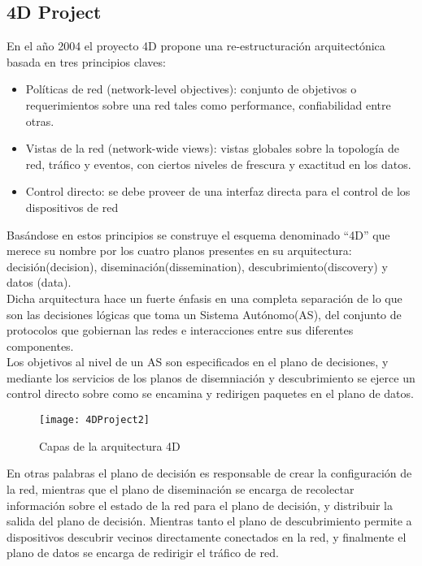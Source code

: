 \subsection{4D Project}
En el año 2004 el proyecto 4D \citep{rexford2004network}\citep{greenberg2005clean} propone una re-estructuración arquitectónica basada en tres principios claves: 

\begin{itemize}
\item Políticas de red (network-level objectives): conjunto de objetivos o requerimientos sobre una red tales como performance, confiabilidad entre otras.

\item Vistas de la red (network-wide views): vistas globales sobre la topolog\'ia de red, tr\'afico y eventos, con ciertos niveles de frescura y exactitud en los datos.

\item Control directo: se debe proveer de una interfaz directa para el control de los dispositivos de red
\end{itemize}

Basándose en estos principios se construye el esquema denominado ``4D'' que merece su nombre por los cuatro planos presentes en su arquitectura: decisión(decision), diseminación(dissemination), descubrimiento(discovery) y datos (data).\\

Dicha arquitectura hace un fuerte énfasis en una completa separación de lo que son las decisiones lógicas que toma un Sistema Autónomo(AS), del conjunto de protocolos que gobiernan las redes e interacciones entre sus diferentes componentes.\\

Los objetivos al nivel de un AS son especificados en el plano de decisiones, y mediante los servicios de los planos de disemniación y descubrimiento se ejerce un control directo sobre como se encamina y redirigen paquetes en el plano de datos.\\

\begin{figure}[htbp!] 
\centering    
\texttt{[image: 4DProject2]}
\caption[Capas de la arquitectura 4D]{Capas de la arquitectura 4D}
\label{fig:4DProject}
\end{figure}

En otras palabras el plano de decisión es responsable de crear la configuración de la red, mientras que el plano de diseminación se encarga de recolectar información sobre el estado de la red para el plano de decisión, y distribuir la salida del plano de decisión. Mientras tanto el plano de descubrimiento permite a dispositivos descubrir vecinos directamente conectados en la red, y finalmente el plano de datos se encarga de redirigir el tráfico de red.\\

